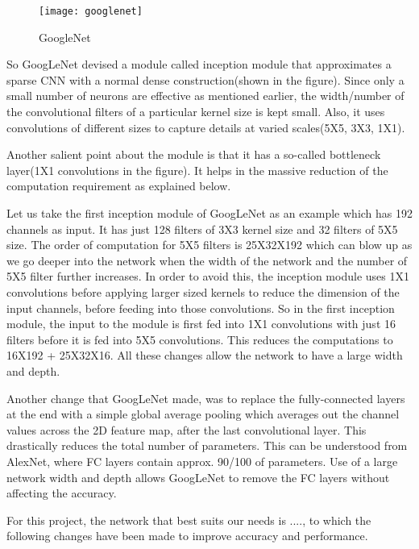 \documentclass[../main.tex]{subfiles}
\begin{document}
\begin{figure}[htbp] 
\centering 
\texttt{[image: googlenet]}
\caption{GoogleNet} 
\label{https://stackoverflow.com/questions/47633393/how-to-calculate-the-number-of-layer-for-googlenet} 
\end{figure}
So GoogLeNet devised a module called inception module that approximates a sparse CNN with a normal dense construction(shown in the figure). Since only a small number of neurons are effective as mentioned earlier, the width/number of the convolutional filters of a particular kernel size is kept small. Also, it uses convolutions of different sizes to capture details at varied scales(5X5, 3X3, 1X1).

Another salient point about the module is that it has a so-called bottleneck layer(1X1 convolutions in the figure). It helps in the massive reduction of the computation requirement as explained below.

Let us take the first inception module of GoogLeNet as an example which has 192 channels as input. It has just 128 filters of 3X3 kernel size and 32 filters of 5X5 size. The order of computation for 5X5 filters is 25X32X192 which can blow up as we go deeper into the network when the width of the network and the number of 5X5 filter further increases. In order to avoid this, the inception module uses 1X1 convolutions before applying larger sized kernels to reduce the dimension of the input channels, before feeding into those convolutions. So in the first inception module, the input to the module is first fed into 1X1 convolutions with just 16 filters before it is fed into 5X5 convolutions. This reduces the computations to 16X192 +  25X32X16. All these changes allow the network to have a large width and depth.

Another change that GoogLeNet made, was to replace the fully-connected layers at the end with a simple global average pooling which averages out the channel values across the 2D feature map, after the last convolutional layer. This drastically reduces the total number of parameters. This can be understood from AlexNet, where FC layers contain approx. 90/100 of parameters. Use of a large network width and depth allows GoogLeNet to remove the FC layers without affecting the accuracy.

For this project, the network that best suits our needs is ...., to which the following changes have been made to improve accuracy and performance.
\cite{cnn}
\end{document}

